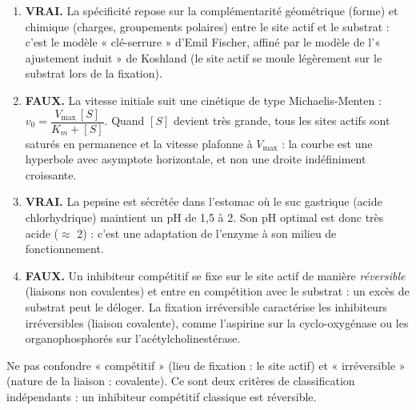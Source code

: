 \documentclass[11pt]{article}
\newcommand{\cle}[1]{{\popxbold\color{popdark}#1}}
\begin{document}
\begin{corrige}
\begin{enumerate}
    \item \textbf{VRAI.} La spécificité repose sur la \cle{complémentarité} géométrique (forme) et chimique (charges, groupements polaires) entre le site actif et le substrat : c'est le modèle « clé-serrure » d'Emil Fischer, affiné par le modèle de l'« ajustement induit » de Koshland (le site actif se moule légèrement sur le substrat lors de la fixation).
    \item \textbf{FAUX.} La vitesse initiale suit une cinétique de type Michaelis-Menten : $v_0 = \dfrac{V_{\text{max}}\,[S]}{K_m + [S]}$. Quand $[S]$ devient très grande, tous les sites actifs sont saturés en permanence et la vitesse plafonne à $V_{\text{max}}$ : la courbe est une hyperbole avec asymptote horizontale, et non une droite indéfiniment croissante.
    \item \textbf{VRAI.} La pepsine est sécrétée dans l'estomac où le suc gastrique (acide chlorhydrique) maintient un pH de 1,5 à 2. Son pH optimal est donc très acide ($\approx$ 2) : c'est une adaptation de l'enzyme à son milieu de fonctionnement.
    \item \textbf{FAUX.} Un inhibiteur compétitif se fixe sur le site actif de manière \emph{réversible} (liaisons non covalentes) et entre en compétition avec le substrat : un excès de substrat peut le déloger. La fixation irréversible caractérise les inhibiteurs irréversibles (liaison covalente), comme l'aspirine sur la cyclo-oxygénase ou les organophosphorés sur l'acétylcholinestérase.
\end{enumerate}
\end{corrige}

\begin{attention}
Ne pas confondre « compétitif » (lieu de fixation : le site actif) et « irréversible » (nature de la liaison : covalente). Ce sont deux critères de classification indépendants : un inhibiteur compétitif classique est réversible.
\end{attention}
\end{document}
